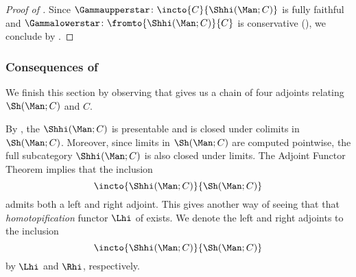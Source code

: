 \begin{proof}[Proof of ]
	Since $ \Gammaupperstar \colon \incto{C}{\Shhi(\Man;C)} $ is fully faithful and $ \Gammalowerstar \colon \fromto{\Shhi(\Man;C)}{C} $ is conservative (), we conclude by .
\end{proof}


\subsubsection{Consequences of \texorpdfstring{}{}}

We finish this section by observing that  gives us a chain of four adjoints relating $ \Sh(\Man;C) $ and $ C $.

\begin{observation}\label{obs:LhiandRhi}
	By , the \category $ \Shhi(\Man;C) $ is presentable and is closed under colimits in $ \Sh(\Man;C) $.
	Moreover, since limits in $ \Sh(\Man;C) $ are computed pointwise, the full subcategory $ \Shhi(\Man;C) $ is also closed under limits.
	The Adjoint Functor Theorem  implies that the inclusion
	\begin{equation*}
		\incto{\Shhi(\Man;C)}{\Sh(\Man;C)}
	\end{equation*}
	admits both a left and right adjoint.
	This gives another way of seeing that that \textit{homotopification} functor $ \Lhi $ of  exists.
	We denote the left and right adjoints to the inclusion
	\begin{equation*}
		\incto{\Shhi(\Man;C)}{\Sh(\Man;C)}
	\end{equation*}
	by $ \Lhi $ and $ \Rhi $, respectively.
\end{observation}

